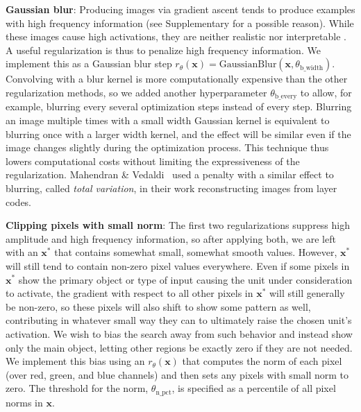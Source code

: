 \documentclass{article}
\newcommand{\x}{\mathbf{x}}
\newcommand{\xs}{\mathbf{x^*}}
\begin{document}
{\bf Gaussian blur}: Producing images via gradient ascent tends to produce examples with high frequency information (see Supplementary  for a possible reason). While these images cause high activations, they are neither realistic nor interpretable \cite{nguyen-2014-arXiv-deep-neural-networks}. A useful regularization is thus to penalize high frequency information. We implement this as a Gaussian blur step $r_\theta(\x) = \mathrm{GaussianBlur}(\x, \theta_{\mathrm{b\_width}})$. Convolving with a blur kernel is more computationally expensive than the other regularization methods, so we added another hyperparameter $\theta_{\mathrm{b\_every}}$ to allow, for example, blurring every several optimization steps instead of every step. Blurring an image multiple times with a small width Gaussian kernel is equivalent to blurring once with a larger width kernel, and the effect will be similar even if the image changes slightly during the optimization process. This technique thus lowers computational costs without limiting the expressiveness of the regularization. Mahendran \& Vedaldi~ used a penalty with a similar effect to blurring, called \emph{total variation}, in their work reconstructing images from layer codes.

{\bf Clipping pixels with small norm}: The first two regularizations suppress high amplitude and high frequency information, so after applying both, we are left with an $\xs$ that contains somewhat small, somewhat smooth values. However, $\xs$ will still tend to contain non-zero pixel values everywhere. Even if some pixels in $\xs$ show the primary object or type of input causing the unit under consideration to activate, the gradient with respect to all other pixels in $\xs$ will still generally be non-zero, so these pixels will also shift to show some pattern as well, contributing in whatever small way they can to ultimately raise the chosen unit's activation. We wish to bias the search away from such behavior and instead show only the main object, letting other regions be exactly zero if they are not needed. We implement this bias using an $r_\theta(\x)$ that computes the norm of each pixel (over red, green, and blue channels) and then sets any pixels with small norm to zero. The threshold for the norm, $\theta_{\mathrm{n\_pct}}$, is specified as a percentile of all pixel norms in $\x$.
\end{document}
